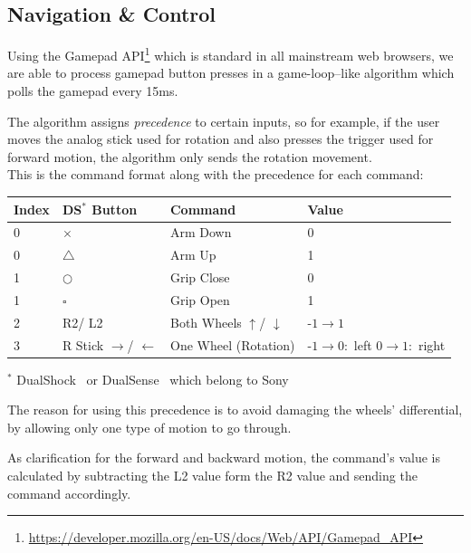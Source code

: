 \documentclass[a4paper,12pt]{article}
\newcommand{\sz}{\text{-}}
\begin{document}
\subsection{Navigation \& Control}

Using the Gamepad API\footnote{\url{https://developer.mozilla.org/en-US/docs/Web/API/Gamepad_API}} which is standard in all mainstream web browsers, we are able to process gamepad button presses in a game-loop--like algorithm which polls the gamepad every 15ms.

The algorithm assigns \textit{precedence} to certain inputs, so for example, if the user moves the analog stick used for rotation and also presses the trigger used for forward motion, the algorithm only sends the rotation movement.\\
This is the command format along with the precedence for each command:
\begin{center}
    \bgroup
    \def\arraystretch{1.5}
    {
    \begin{tabular}{|l|l|l|p{6em}|}
        \hline
        \textbf{Index} & \textbf{DS$^*$ Button} & \textbf{Command} & \textbf{Value}\\
        \hline
        0 & $\times$ & Arm Down & 0 \\
        \hline
        0 & $\triangle$ & Arm Up & 1 \\
        \hline
        1 & $\bigcirc$ & Grip Close & 0 \\
        \hline
        1 & $\square$ & Grip Open & 1 \\
        \hline
        2 & R2/ L2  & Both Wheels $\uparrow$/ $\downarrow$ & $\sz1 \rightarrow 1$ \\
        \hline
        3 & R Stick $\rightarrow$/ $\leftarrow$ & One Wheel (Rotation) & $\sz1 \rightarrow 0 :$ left \newline $0 \rightarrow 1:$ right\\
        \hline
    \end{tabular}}
    \egroup

    \footnotesize{$^*$ DualShock \textregistered\ or DualSense \textregistered\ which belong to Sony \texttrademark}\\
\end{center}

The reason for using this precedence is to avoid damaging the wheels' differential, by allowing only one type of motion to go through.

As clarification for the forward and backward motion, the command's value is calculated by subtracting the L2 value form the R2 value and sending the command accordingly.
\end{document}
